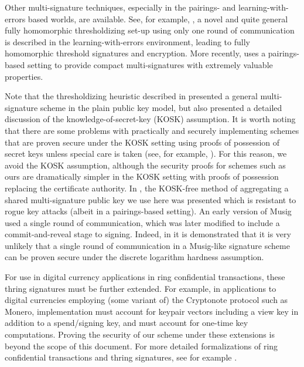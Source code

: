 \documentclass{iacrtrans}
\theoremstyle{definition}
\numberwithin{theorem}{subsection}
\numberwithin{lemma}{theorem}
\begin{document}
Other multi-signature techniques, especially in the pairings- and learning-with-errors based worlds, are available. See, for example, \cite{bonehthreshold}, a novel and quite general fully homomorphic thresholdizing set-up using only one round of communication is described in the learning-with-errors environment, leading to fully homomorphic threshold signatures and encryption.  More recently, \cite{bonehcompact} uses a pairings-based setting to provide compact multi-signatures with extremely valuable properties.

Note that the thresholdizing heuristic described in \cite{bellare2006multi} presented a general multi-signature scheme in the plain public key model, but also presented a detailed discussion of the knowledge-of-secret-key (KOSK) assumption. It is worth noting that there are some problems with practically and securely implementing schemes that are proven secure under the KOSK setting using proofs of possession of secret keys unless special care is taken (see, for example, \cite{ristenpart2007power}). For this reason, we avoid the KOSK assumption, although the security proofs for schemes such as ours are dramatically simpler in the KOSK setting with proofs of possession replacing the certificate authority. In \cite{qian2010non}, the KOSK-free method of aggregating a shared multi-signature public key we use here was presented which is resistant to rogue key attacks (albeit in a pairings-based setting).  An early version of Musig used a single round of communication, which was later modified to include a commit-and-reveal stage to signing. Indeed, in \cite{drijvers2018okamoto} it is demonstrated that it is very unlikely that a single round of communication in a Musig-like signature scheme can be proven secure under the discrete logarithm hardness assumption.  
 



For use in digital currency applications in ring confidential transactions, these thring signatures must be further extended. For example, in applications to digital currencies employing (some variant of) the Cryptonote protocol such as Monero, implementation must account for keypair vectors including a view key in addition to a spend/signing key, and must account for one-time key computations. Proving the security of our scheme under these extensions is beyond the scope of this document. For more detailed formalizations of ring confidential transactions and thring signatures, see for example \cite{ruffct2}.

 
\end{document}
